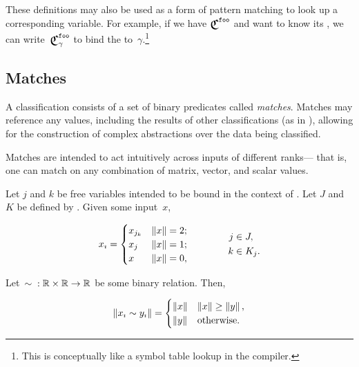 These definitions may also be used as a form of pattern matching to look up
  a corresponding variable.
For example,
  if we have $\Classify^\texttt{foo}$ and want to know its ,
    we can write~$\Classify^\texttt{foo}_\gamma$ to bind the
     to~$\gamma$.\footnote{%
      This is conceptually like a symbol table lookup in the compiler.}



\subsection{Matches}
A classification consists of a set of binary predicates called
  \emph{matches}.
Matches may reference any values,
  including the results of other classifications
    (as in ),
  allowing for the construction of complex abstractions over the data being
  classified.

Matches are intended to act intuitively across inputs of different ranks---%
  that is,
    one can match on any combination of matrix, vector, and scalar values.

\begin{axiom}
  Let $j$ and $k$ be free variables intended to be bound in the
    context of .
  Let $J$ and $K$ be defined by .
  Given some input~$x$,

  \begin{equation*}
    {x}_{\imath} =
      \begin{cases}
        x_{j_k} &\left\|x\right\| = 2; \\
        x_j     &\left\|x\right\| = 1; \\
        x       &\left\|x\right\| = 0,
      \end{cases}
    \qquad\qquad
    \begin{aligned}
      j&\in J, \\
      k&\in K_j.
    \end{aligned}
  \end{equation*}
\end{axiom}

\begin{axiom}
  Let~$\sim{} : \mathbb{R}\times\mathbb{R}\rightarrow\mathbb{R}$ be some binary relation.
  Then,

  \begin{equation*}
    \left\|{x}_{\imath} \sim {y}_{\imath}\right\| =
      \begin{cases}
        \left\|x\right\| &\left\|x\right\| \geq \left\|y\right\|, \\
        \left\|y\right\| &\text{otherwise}.
      \end{cases}
  \end{equation*}
\end{axiom}

